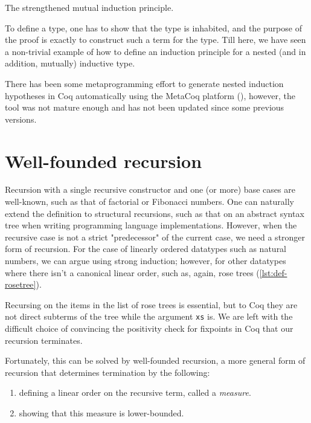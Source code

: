 \begin{listing}[H]
  \caption{The strengthened mutual induction principle.}
  \label{lst:def-nn-ihs}
\end{listing}

To define a type, one has to show that the type is inhabited, and the purpose of
the proof is exactly to construct such a term for the type. Till here, we have
seen a non-trivial example of how to define an induction principle for a nested
(and in addition, mutually) inductive type.

There has been some metaprogramming effort to generate nested induction
hypotheses in Coq automatically using the MetaCoq platform
(\cite{liesnikov2020generating}), however, the tool was not mature enough and
has not been updated since some previous versions.

\section{Well-founded recursion}

Recursion with a single recursive constructor and one (or more) base cases are
well-known, such as that of factorial or Fibonacci numbers. One can naturally
extend the definition to structural recursions, such as that on an abstract
syntax tree when writing programming language implementations. However, when the
recursive case is not a strict "predecessor" of the current case, we need a
stronger form of recursion. For the case of linearly ordered datatypes such as
natural numbers, we can argue using strong induction; however, for other
datatypes where there isn't a canonical linear order, such as, again, rose
trees (\ref{lst:def-rosetree}). 

Recursing on the items in the list of rose trees is essential, but to Coq they
are not direct subterms of the tree while the argument \verb|xs| is. We are left
with the difficult choice of convincing the positivity check for fixpoints in
Coq that our recursion terminates.

Fortunately, this can be solved by well-founded recursion, a more general form
of recursion that determines termination by the following:
\begin{enumerate}
  \item defining a linear order on the recursive term, called a \emph{measure}.
  \item showing that this measure is lower-bounded.
\end{enumerate}

